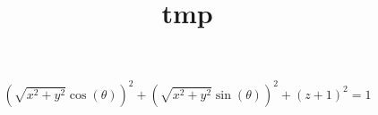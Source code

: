 
\title{tmp}
\usepackage{cancel}



\[
	\left(\sqrt{x^{2}+y^{2}}\cos\left(\theta\right)\right)^{2}+\left(\sqrt{x^{2}+y^{2}}\sin\left(\theta\right)\right)^{2}+\left(z+1\right)^{2}=1

\]



